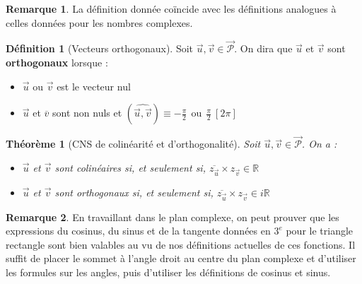 \documentclass[french]{book}
\newcommand{\R}{\mathbb{R}}
\theoremstyle{plain}
\newtheorem{thm}{Théorème}[chapter]
\theoremstyle{definition}
\newtheorem{dfn}{Définition}[chapter]
\newtheorem{rmq}{Remarque}[chapter]
\theoremstyle{remark}
\begin{document}
\begin{rmq}
	La définition donnée coïncide avec les définitions analogues à celles données pour les nombres complexes.
\end{rmq}
\begin{dfn}[Vecteurs orthogonaux]
	Soit $\overrightarrow{u},\overrightarrow{v}\in\overrightarrow{\mathcal{P}}$. On dira que $\overrightarrow{u}$ et $\overrightarrow{v}$ sont \textbf{orthogonaux} lorsque : \begin{itemize}
		\item $\overrightarrow{u}$ ou $\overrightarrow{v}$ est le vecteur nul
		\item $\overrightarrow{u}$ et $\overline{v}$ sont non nuls et $(\widehat{\overrightarrow{u},\overrightarrow{v}})\equiv \displaystyle-\frac{\pi}{2} \ \ \text{ou}\ \ \frac{\pi}{2} \ [2\pi]$
	\end{itemize}
\end{dfn}
\begin{thm}[CNS de colinéarité et d'orthogonalité]
	Soit $\overrightarrow{u},\overrightarrow{v}\in\overrightarrow{\mathcal{P}}$. On a : \begin{itemize}
		\item $\overrightarrow{u}$ et $\overrightarrow{v}$ sont colinéaires si, et seulement si, $\overline{z_{\overrightarrow{u}}}\times z_{\overrightarrow{v}}\in\R$
		\item $\overrightarrow{u}$ et $\overrightarrow{v}$ sont orthogonaux si, et seulement si, $\overline{z_{\overrightarrow{u}}}\times z_{\overrightarrow{v}}\in i\R$
	\end{itemize}
\end{thm}
\begin{rmq}
	En travaillant dans le plan complexe, on peut prouver que les expressions du cosinus, du sinus et de la tangente données en $3^e$ pour le triangle rectangle sont bien valables au vu de nos définitions actuelles de ces fonctions. Il suffit de placer le sommet à l'angle droit au centre du plan complexe et d'utiliser les formules sur les angles, puis d'utiliser les définitions de cosinus et sinus.
\end{rmq}
\end{document}
